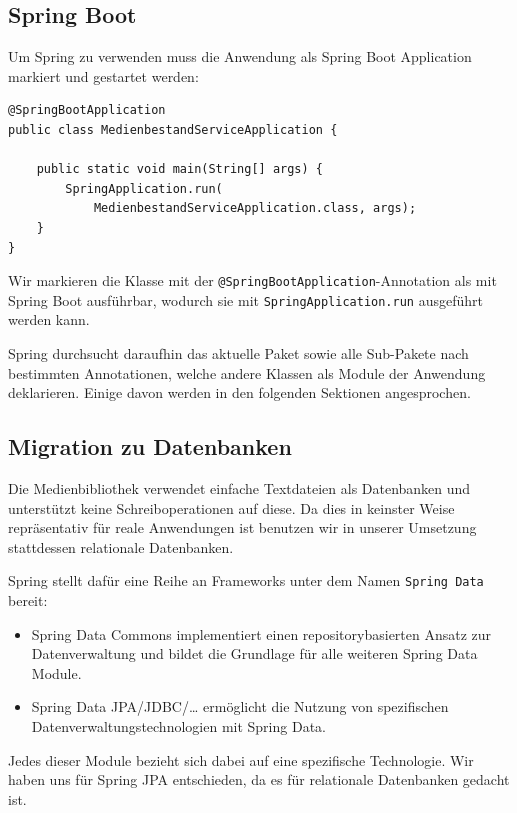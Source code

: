 \documentclass{article}
\begin{document}
\subsection{Spring Boot}

Um Spring zu verwenden muss die Anwendung als Spring Boot Application markiert und gestartet werden:

\begin{lstlisting}
@SpringBootApplication
public class MedienbestandServiceApplication {

    public static void main(String[] args) {
        SpringApplication.run(
        	MedienbestandServiceApplication.class, args);
    }
}
\end{lstlisting}

Wir markieren die Klasse mit der \texttt{@SpringBootApplication}-Annotation als mit Spring Boot ausführbar, wodurch sie mit \texttt{SpringApplication.run} ausgeführt werden kann.

Spring durchsucht daraufhin das aktuelle Paket sowie alle Sub-Pakete nach bestimmten Annotationen, welche andere Klassen als Module der Anwendung deklarieren.
Einige davon werden in den folgenden Sektionen angesprochen.

\subsection{Migration zu Datenbanken}

Die Medienbibliothek verwendet einfache Textdateien als Datenbanken und unterstützt keine Schreiboperationen auf diese.
Da dies in keinster Weise repräsentativ für reale Anwendungen ist benutzen wir in unserer Umsetzung stattdessen relationale Datenbanken.

Spring stellt dafür eine Reihe an Frameworks unter dem Namen \texttt{Spring Data} bereit:
\begin{itemize}
        \item{Spring Data Commons} {implementiert einen repositorybasierten Ansatz zur Datenverwaltung und bildet die Grundlage für alle weiteren Spring Data Module.}
        \item{Spring Data JPA/JDBC/\ldots} ermöglicht die Nutzung von spezifischen Datenverwaltungstechnologien mit Spring Data.
\end{itemize}

Jedes dieser Module bezieht sich dabei auf eine spezifische Technologie.
Wir haben uns für Spring JPA entschieden, da es für relationale Datenbanken gedacht ist.
\end{document}
